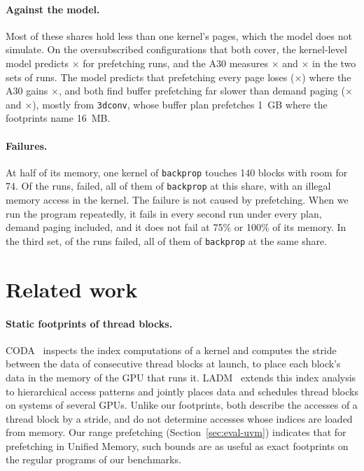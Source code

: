 \documentclass[11pt]{article}
\newcommand{\secref}[1]{Section~\ref{#1}}
\newcommand{\code}[1]{\texttt{#1}}
\begin{document}
\paragraph{Against the model.} Most of these shares hold less than one kernel's pages, which the model does not
simulate. On the \numHwModelConfigs{} oversubscribed configurations that both cover, the kernel-level model
predicts \numHwModelHyMin{}$\times$ for prefetching runs, and the A30 measures \numHwMeasuredHyMin{}$\times$ and
\numHwMeasuredTrMin{}$\times$ in the two sets of runs.
The model predicts that prefetching every page loses (\numHwModelHy{}$\times$) where the A30 gains
\numHwMeasuredHy{}$\times$, and both find buffer prefetching far slower than demand paging
(\numHwModelBuf{}$\times$ and \numHwMeasuredBuf{}$\times$), mostly from \code{3dconv}, whose buffer plan
prefetches 1~GB where the footprints name 16~MB.

\paragraph{Failures.} At half of its memory, one kernel of \code{backprop} touches 140 blocks with room for 74. Of
the \numHwRuns{} runs, \numHwFailRuns{} failed, all of them of \code{backprop} at this share, with an illegal memory
access in the kernel. The failure is not caused by prefetching. When we run the program repeatedly, it fails in
every second run under every plan, demand paging included, and it does not fail at 75\% or 100\% of its
memory. In the third set, \numHwCheapFailRuns{} of the \numHwCheapRuns{} runs failed, all of them of \code{backprop}
at the same share.

\section{Related work}
\label{sec:related}

\paragraph{Static footprints of thread blocks.} CODA~\cite{Kim2018CODA} inspects the index computations of a kernel
and computes the stride between the data of consecutive thread blocks at launch, to place each block's data in the
memory of the GPU that runs it. LADM~\cite{Khairy2020LADM} extends this index analysis to hierarchical access
patterns and jointly places data and schedules thread blocks on systems of several GPUs. Unlike our footprints,
both describe the accesses of a thread block by a stride, and do not determine accesses whose indices are loaded
from memory. Our range prefetching (\secref{sec:eval-uvm}) indicates that for prefetching in Unified Memory, such
bounds are as useful as exact footprints on the regular programs of our benchmarks.
\end{document}
